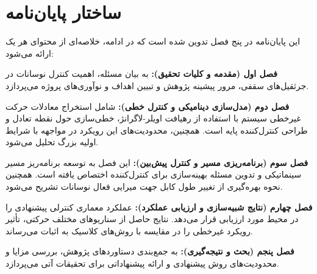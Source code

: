 
\section{ساختار پایان‌نامه}

این پایان‌نامه در پنج فصل تدوین شده است که در ادامه، خلاصه‌ای از محتوای هر یک ارائه می‌شود:

\textbf{فصل اول (مقدمه و کلیات تحقیق):} به بیان مسئله، اهمیت کنترل نوسانات در جرثقیل‌های سقفی، مرور پیشینه پژوهش و تبیین اهداف و نوآوری‌های پروژه می‌پردازد.

\textbf{فصل دوم (مدل‌سازی دینامیکی و کنترل خطی):} شامل استخراج معادلات حرکت غیرخطی سیستم با استفاده از رهیافت اویلر-لاگرانژ، خطی‌سازی حول نقطه تعادل و طراحی کنترل‌کننده پایه  است. همچنین، محدودیت‌های این رویکرد در مواجهه با شرایط اولیه بزرگ تحلیل می‌شود.

\textbf{فصل سوم (برنامه‌ریزی مسیر و کنترل پیش‌بین):} این فصل به توسعه برنامه‌ریز مسیر سینماتیکی و تدوین مسئله بهینه‌سازی برای کنترل‌کننده  اختصاص یافته است. همچنین نحوه بهره‌گیری از تغییر طول کابل جهت میرایی فعال نوسانات تشریح می‌شود.

\textbf{فصل چهارم (نتایج شبیه‌سازی و ارزیابی عملکرد):} عملکرد معماری کنترلی پیشنهادی را در محیط  مورد ارزیابی قرار می‌دهد. نتایج حاصل از سناریوهای مختلف حرکتی، تأثیر رویکرد غیرخطی را در مقایسه با روش‌های کلاسیک به اثبات می‌رساند.

\textbf{فصل پنجم (بحث و نتیجه‌گیری):} به جمع‌بندی دستاوردهای پژوهش، بررسی مزایا و محدودیت‌های روش پیشنهادی و ارائه پیشنهاداتی برای تحقیقات آتی می‌پردازد.